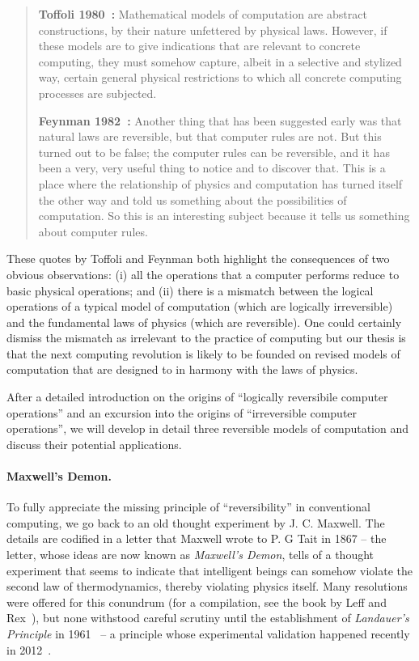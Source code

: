 \documentclass{article}
\begin{document}
\begin{quote}
  \textbf{Toffoli 1980~\cite{toffoli:1980}:} Mathematical models of computation are
  abstract constructions, by their nature unfettered by physical
  laws. However, if these models are to give indications that are
  relevant to concrete computing, they must somehow capture, albeit in
  a selective and stylized way, certain general physical restrictions
  to which all concrete computing processes are
  subjected.

  \textbf{Feynman 1982~\cite{springerlink:10.1007/bf02650179}:}
  Another thing that has been suggested early was that natural laws
  are reversible, but that computer rules are not. But this turned out
  to be false; the computer rules can be reversible, and it has been a
  very, very useful thing to notice and to discover that. This is a
  place where the relationship of physics and computation has turned
  itself the other way and told us something about the possibilities
  of computation. So this is an interesting subject because it tells
  us something about computer rules.
\end{quote}

\noindent These quotes by Toffoli and Feynman both highlight the
consequences of two obvious observations: (i) all the operations that
a computer performs reduce to basic physical operations; and (ii)
there is a mismatch between the logical operations of a typical model
of computation (which are logically irreversible) and the fundamental
laws of physics (which are reversible). One could certainly dismiss
the mismatch as irrelevant to the practice of computing but our thesis
is that the next computing revolution is likely to be founded on
revised models of computation that are designed to in harmony with the
laws of physics.

After a detailed introduction on the origins of ``logically
reversibile computer operations'' and an excursion into the origins of
``irreversible computer operations'', we will develop in detail three
reversible models of computation and discuss their potential
applications.

\paragraph*{Maxwell's Demon.}
To fully appreciate the missing principle of ``reversibility'' in
conventional computing, we go back to an old thought experiment by
J. C. Maxwell. The details are codified in a letter that Maxwell wrote
to P. G Tait in 1867 -- the letter, whose ideas are now known as
\emph{Maxwell's Demon}, tells of a thought experiment that seems to
indicate that intelligent beings can somehow violate the second law of
thermodynamics, thereby violating physics itself. Many resolutions
were offered for this conundrum (for a compilation, see the book by
Leff and Rex~\cite{leff1990}), but none withstood careful scrutiny
until the establishment of \emph{Landauer's Principle} in
1961~\cite{Landauer:1961} -- a principle whose experimental validation
happened recently in 2012~\cite{berut2012experimental}.
\end{document}
